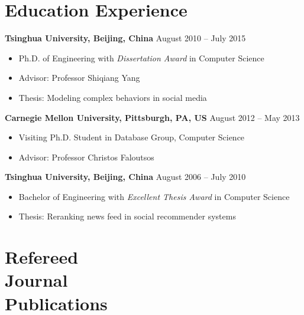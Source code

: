 \documentclass[margin, 10pt]{res}
\begin{document}
\begin{resume}

\section{Education Experience}

\textbf{Tsinghua University, Beijing, China} \hfill{August 2010 -- July 2015}
\begin{itemize} \itemsep -2pt
\item Ph.D. of Engineering with \textit{Dissertation Award} in Computer Science
\item Advisor: Professor Shiqiang Yang
\item Thesis: Modeling complex behaviors in social media
\end{itemize}

\textbf{Carnegie Mellon University, Pittsburgh, PA, US} \hfill{August 2012 -- May 2013}
\begin{itemize} \itemsep -2pt
\item Visiting Ph.D. Student in Database Group, Computer Science
\item Advisor: Professor Christos Faloutsos
\end{itemize}

\textbf{Tsinghua University, Beijing, China} \hfill{August 2006 -- July 2010}
\begin{itemize} \itemsep -2pt
\item Bachelor of Engineering with \textit{Excellent Thesis Award} in Computer Science
\item Thesis: Reranking news feed in social recommender systems
\end{itemize}


\section{Refereed \\ Journal \\ Publications}


\end{resume}
\end{document}
